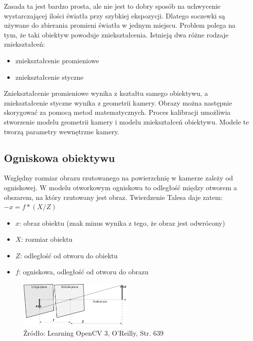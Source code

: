 \documentclass[magisterska]{pracadypl}
\begin{document}
Zasada ta jest bardzo prosta, ale nie jest to dobry sposób na uchwycenie wystarczającej ilości światła przy szybkiej ekspozycji.
Dlatego soczewki są używane do zbierania promieni światła w jednym miejscu. Problem polega na tym, że taki obiektyw powoduje zniekształcenia.
Istnieją dwa różne rodzaje zniekształceń:
\begin{itemize}
  \item zniekształcenie promieniowe
  \item zniekształcenie styczne
\end{itemize}
Zniekształcenie promieniowe wynika z kształtu samego obiektywu, a zniekształcenie styczne
wynika z geometrii kamery. Obrazy można następnie skorygować za pomocą metod matematycznych.
Proces kalibracji umożliwia stworzenie modelu geometrii kamery i modelu zniekształceń obiektywu.
Modele te tworzą parametry wewnętrzne kamery.

\subsection{Ogniskowa obiektywu}

Względny rozmiar obrazu rzutowanego na powierzchnię w kamerze zależy od ogniskowej.
W modelu otworkowym ogniskowa to odległość między otworem
a obszarem, na który rzutowany jest obraz.
Twierdzenie Talesa daje zatem: $-x = f * (X / Z)$

\begin{itemize}
  \item \textbf{$x$}: obraz obiektu (znak minus wynika z tego, że obraz jest odwrócony)
  \item \textbf{$X$}: rozmiar obiektu
  \item \textbf{$Z$}: odległość od otworu do obiektu
  \item \textbf{$f$}: ogniskowa, odległość od otworu do obrazu
\end{itemize}

\begin{figure}[h]  %
    \centering  %
    \includegraphics[width=0.5\textwidth]{images/pinhole.png}  %
    \captionsetup{labelformat=empty, font=footnotesize}
    \caption{Źródło: Learning OpenCV 3, O'Reilly, Str. 639}
    \label{fig:rpi}  %
\end{figure}
\end{document}
